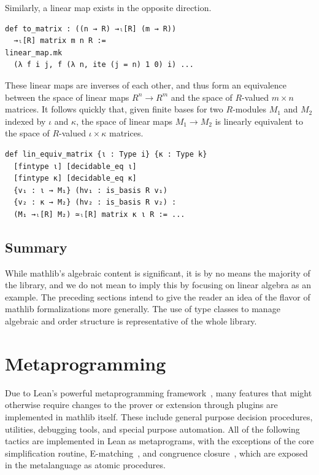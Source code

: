 \documentclass[sigplan]{acmart}\settopmatter{}
\newcommand{\mathlib}{\textsf{mathlib}\xspace}
\begin{document}
Similarly, a linear map exists in the opposite direction.
\begin{lstlisting}
def to_matrix : ((n → R) →ₗ[R] (m → R))
  →ₗ[R] matrix m n R :=
linear_map.mk
  (λ f i j, f (λ n, ite (j = n) 1 0) i) ...
\end{lstlisting}

These linear maps are inverses of each other,
and thus form an equivalence between
the space of linear maps $R^n \to R^m$
and the space of $R$-valued $m \times n$ matrices.
It follows quickly that,
given finite bases for two $R$-modules $M_1$ and $M_2$ indexed by $\iota$ and $\kappa$,
the space of linear maps $M_1 \to M_2$ is linearly equivalent to the space of $R$-valued $\iota \times \kappa$ matrices.
\begin{lstlisting}
def lin_equiv_matrix {ι : Type i} {κ : Type k}
  [fintype ι] [decidable_eq ι]
  [fintype κ] [decidable_eq κ]
  {v₁ : ι → M₁} (hv₁ : is_basis R v₁)
  {v₂ : κ → M₂} (hv₂ : is_basis R v₂) :
  (M₁ →ₗ[R] M₂) ≃ₗ[R] matrix κ ι R := ...
\end{lstlisting}

\subsection{Summary}
\label{subsection:linalg:summary}

While \mathlib's algebraic content is significant, 
it is by no means the majority of the library, 
and we do not mean to imply this by focusing on linear algebra as an example.
The preceding sections intend to give the reader an idea of the flavor of \mathlib formalizations more generally. 
The use of type classes to manage algebraic and order structure is representative of the whole library. 


\section{Metaprogramming}
\label{section:metaprogramming}

Due to Lean's powerful metaprogramming framework~\cite{EURAM17}, many features
that might otherwise require changes to the prover or extension
through plugins are implemented in \mathlib itself. These
include general purpose decision procedures, utilities, debugging
tools, and special purpose automation.
All of the following tactics are implemented in Lean as metaprograms,
with the exceptions of the core simplification routine,
E-matching~\cite{Mour07},
and congruence closure~\cite{Sels16},
which are exposed in the metalanguage as atomic procedures.
\end{document}
